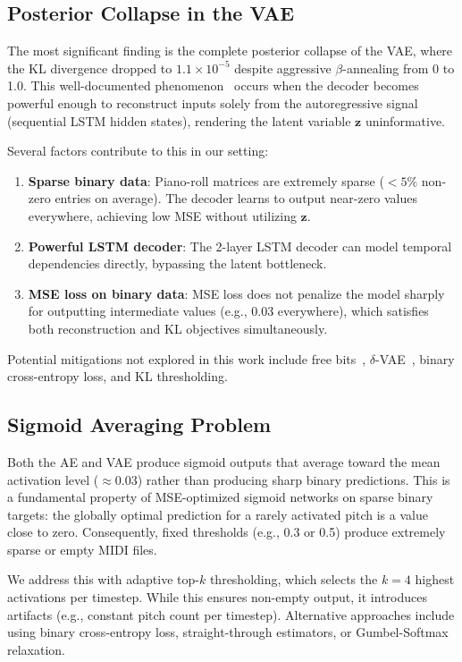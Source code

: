 \documentclass[conference]{IEEEtran}
\begin{document}
\subsection{Posterior Collapse in the VAE}

The most significant finding is the complete posterior collapse of the VAE, where the KL divergence dropped to $1.1 \times 10^{-5}$ despite aggressive $\beta$-annealing from 0 to 1.0. This well-documented phenomenon~\cite{bowman2016generating} occurs when the decoder becomes powerful enough to reconstruct inputs solely from the autoregressive signal (sequential LSTM hidden states), rendering the latent variable $\mathbf{z}$ uninformative.

Several factors contribute to this in our setting:
\begin{enumerate}
    \item \textbf{Sparse binary data}: Piano-roll matrices are extremely sparse ($<5\%$ non-zero entries on average). The decoder learns to output near-zero values everywhere, achieving low MSE without utilizing $\mathbf{z}$.
    \item \textbf{Powerful LSTM decoder}: The 2-layer LSTM decoder can model temporal dependencies directly, bypassing the latent bottleneck.
    \item \textbf{MSE loss on binary data}: MSE loss does not penalize the model sharply for outputting intermediate values (e.g., 0.03 everywhere), which satisfies both reconstruction and KL objectives simultaneously.
\end{enumerate}

Potential mitigations not explored in this work include free bits~\cite{kingma2016improved}, $\delta$-VAE~\cite{razavi2019preventing}, binary cross-entropy loss, and KL thresholding.

\subsection{Sigmoid Averaging Problem}

Both the AE and VAE produce sigmoid outputs that average toward the mean activation level ($\approx 0.03$) rather than producing sharp binary predictions. This is a fundamental property of MSE-optimized sigmoid networks on sparse binary targets: the globally optimal prediction for a rarely activated pitch is a value close to zero. Consequently, fixed thresholds (e.g., 0.3 or 0.5) produce extremely sparse or empty MIDI files.

We address this with adaptive top-$k$ thresholding, which selects the $k=4$ highest activations per timestep. While this ensures non-empty output, it introduces artifacts (e.g., constant pitch count per timestep). Alternative approaches include using binary cross-entropy loss, straight-through estimators, or Gumbel-Softmax relaxation.
\end{document}
